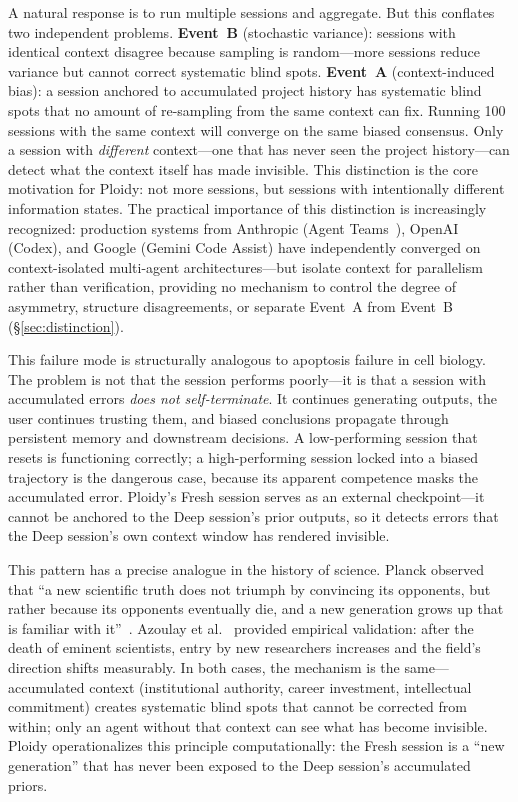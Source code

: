 \documentclass[11pt]{article}
\begin{document}
A natural response is to run multiple sessions and aggregate. But this conflates two independent problems. \textbf{Event~B} (stochastic variance): sessions with identical context disagree because sampling is random---more sessions reduce variance but cannot correct systematic blind spots. \textbf{Event~A} (context-induced bias): a session anchored to accumulated project history has systematic blind spots that no amount of re-sampling from the same context can fix. Running 100 sessions with the same context will converge on the same biased consensus. Only a session with \emph{different} context---one that has never seen the project history---can detect what the context itself has made invisible. This distinction is the core motivation for Ploidy: not more sessions, but sessions with intentionally different information states. The practical importance of this distinction is increasingly recognized: production systems from Anthropic (Agent Teams~\citep{anthropic2026agentteams}), OpenAI (Codex), and Google (Gemini Code Assist) have independently converged on context-isolated multi-agent architectures---but isolate context for parallelism rather than verification, providing no mechanism to control the degree of asymmetry, structure disagreements, or separate Event~A from Event~B (\S\ref{sec:distinction}).

This failure mode is structurally analogous to apoptosis failure in cell biology. The problem is not that the session performs poorly---it is that a session with accumulated errors \emph{does not self-terminate}. It continues generating outputs, the user continues trusting them, and biased conclusions propagate through persistent memory and downstream decisions. A low-performing session that resets is functioning correctly; a high-performing session locked into a biased trajectory is the dangerous case, because its apparent competence masks the accumulated error. Ploidy's Fresh session serves as an external checkpoint---it cannot be anchored to the Deep session's prior outputs, so it detects errors that the Deep session's own context window has rendered invisible.

This pattern has a precise analogue in the history of science. Planck observed that ``a new scientific truth does not triumph by convincing its opponents, but rather because its opponents eventually die, and a new generation grows up that is familiar with it''~\citep{planck1950}. Azoulay et al.~\citep{azoulay2019} provided empirical validation: after the death of eminent scientists, entry by new researchers increases and the field's direction shifts measurably. In both cases, the mechanism is the same---accumulated context (institutional authority, career investment, intellectual commitment) creates systematic blind spots that cannot be corrected from within; only an agent without that context can see what has become invisible. Ploidy operationalizes this principle computationally: the Fresh session is a ``new generation'' that has never been exposed to the Deep session's accumulated priors.
\end{document}
